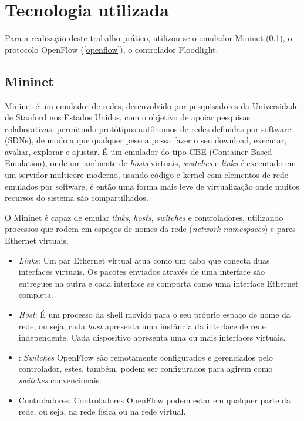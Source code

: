 \section*{Tecnologia utilizada}

Para a realização deste trabalho prático, utilizou-se o emulador Mininet (\ref{mininet}), o protocolo OpenFlow (\ref{openflow}), o controlador Floodlight. %

\subsection{Mininet} \label{mininet}

Mininet é um emulador de redes, desenvolvido por pesquisadores da Universidade de Stanford nos Estados Unidos, com o objetivo de apoiar pesquisas colaborativas, permitindo protótipos autônomos de redes definidas por software (SDNs), de modo a que qualquer pessoa possa fazer o seu download, executar, avaliar, explorar e ajustar.
É um emulador do tipo CBE (Container-Based Emulation), onde um ambiente de \textit{hosts} virtuais, \textit{switches} e \textit{links} é executado em um servidor multicore moderno, usando código e kernel com elementos de rede emulados por software, é então uma forma mais leve de virtualização onde muitos recursos do sistema são compartilhados. 

O Mininet é capaz de emular \textit{links}, \textit{hosts}, \textit{switches} e controladores, utilizando processos que rodem em espaços de nomes da rede (\textit{network namespaces}) e pares Ethernet virtuais.

\begin{itemize}

	\item \textit{Links}: Um par Ethernet virtual atua como um cabo que conecta duas interfaces virtuais. Os pacotes enviados através de uma interface são entregues na outra e cada interface se comporta como uma interface Ethernet completa.
	
	\item \textit{Host}: É um processo da shell movido para o seu próprio espaço de nome da rede, ou seja, cada \textit{host} apresenta uma instância da interface de rede independente. Cada dispositivo apresenta uma ou mais interfaces virtuais.
	
	\item {}: \textit{Switches} OpenFlow são remotamente configurados e gerenciados pelo controlador, estes, também, podem ser configurados para agirem como \textit{switches} convencionais.
	
	\item Controladores: Controladores OpenFlow podem estar em qualquer parte da rede, ou seja, na rede física ou na rede virtual.

\end{itemize}

